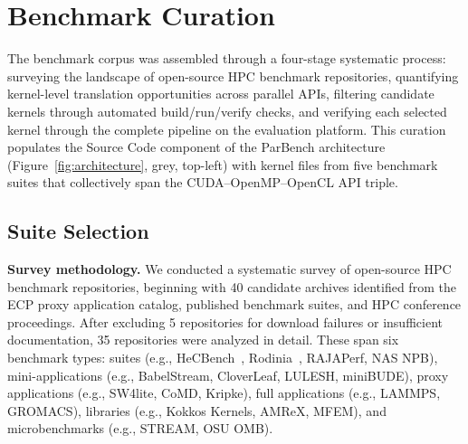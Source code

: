 \section{Benchmark Curation}
\label{sec:benchmark-curation}

The benchmark corpus was assembled through a four-stage systematic process: surveying the landscape of open-source HPC benchmark repositories, quantifying kernel-level translation opportunities across parallel APIs, filtering candidate kernels through automated build/run/verify checks, and verifying each selected kernel through the complete pipeline on the evaluation platform. This curation populates the Source Code component of the ParBench architecture (Figure~\ref{fig:architecture}, grey, top-left) with kernel files from five benchmark suites that collectively span the CUDA--OpenMP--OpenCL API triple.

\subsection{Suite Selection}
\label{sec:suite-selection}

\textbf{Survey methodology.} We conducted a systematic survey of open-source HPC benchmark repositories, beginning with 40 candidate archives identified from the ECP proxy application catalog, published benchmark suites, and HPC conference proceedings. After excluding 5 repositories for download failures or insufficient documentation, 35 repositories were analyzed in detail. These span six benchmark types: suites (e.g., HeCBench~\cite{HeCBench2023}, Rodinia~\cite{Rodinia2009}, RAJAPerf, NAS NPB), mini-applications (e.g., BabelStream, CloverLeaf, LULESH, miniBUDE), proxy applications (e.g., SW4lite, CoMD, Kripke), full applications (e.g., LAMMPS, GROMACS), libraries (e.g., Kokkos Kernels, AMReX, MFEM), and microbenchmarks (e.g., STREAM, OSU OMB).

